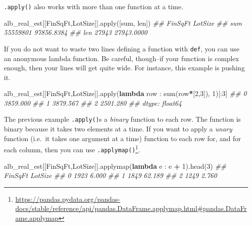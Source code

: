 \documentclass[
  12pt,
  krantz2]{krantz}
\makeatletter
\newenvironment{Shaded}{\begin{snugshade}}{\end{snugshade}}
\newcommand{\BuiltInTok}[1]{#1}
\newcommand{\CommentTok}[1]{\textcolor[rgb]{0.37,0.37,0.37}{\textit{#1}}}
\newcommand{\DecValTok}[1]{\textcolor[rgb]{0.06,0.06,0.06}{#1}}
\newcommand{\KeywordTok}[1]{\textcolor[rgb]{0.27,0.27,0.27}{\textbf{#1}}}
\newcommand{\NormalTok}[1]{#1}
\newcommand{\OperatorTok}[1]{\textcolor[rgb]{0.43,0.43,0.43}{\textbf{#1}}}
\newcommand{\StringTok}[1]{\textcolor[rgb]{0.5,0.5,0.5}{#1}}
\renewcommand{\href}[2]{#2\footnote{\url{#1}}}
\newenvironment{kframe}{%
\medskip{}
\setlength{\fboxsep}{.8em}
 \def\at@end@of@kframe{}%
 \ifinner\ifhmode%
  \def\at@end@of@kframe{\end{minipage}}%
  \begin{minipage}{\columnwidth}%
 \fi\fi%
 \def\FrameCommand##1{\hskip\@totalleftmargin \hskip-\fboxsep
 \colorbox{shadecolor}{##1}\hskip-\fboxsep
     \hskip-\linewidth \hskip-\@totalleftmargin \hskip\columnwidth}%
 \MakeFramed {\advance\hsize-\width
   \@totalleftmargin\z@ \linewidth\hsize
   \@setminipage}}%
 {\par\unskip\endMakeFramed%
 \at@end@of@kframe}
\renewenvironment{Shaded}{\begin{kframe}}{\end{kframe}}
\makeatother
\begin{document}
\texttt{.apply()} also works with more than one function at a time.

\begin{Shaded}
\begin{Highlighting}[]
\NormalTok{alb\_real\_est[[}\StringTok{\textquotesingle{}FinSqFt\textquotesingle{}}\NormalTok{,}\StringTok{\textquotesingle{}LotSize\textquotesingle{}}\NormalTok{]].}\BuiltInTok{apply}\NormalTok{([}\BuiltInTok{sum}\NormalTok{, }\BuiltInTok{len}\NormalTok{])}
\CommentTok{\#\#       FinSqFt     LotSize}
\CommentTok{\#\# sum  55559801  97856.8384}
\CommentTok{\#\# len     27943  27943.0000}
\end{Highlighting}
\end{Shaded}

If you do not want to waste two lines defining a function with \texttt{def}, you can use an anonymous lambda function. Be careful, though--if your function is complex enough, then your lines will get quite wide. For instance, this example is pushing it.

\begin{Shaded}
\begin{Highlighting}[]
\NormalTok{alb\_real\_est[[}\StringTok{\textquotesingle{}FinSqFt\textquotesingle{}}\NormalTok{,}\StringTok{\textquotesingle{}LotSize\textquotesingle{}}\NormalTok{]].}\BuiltInTok{apply}\NormalTok{(}\KeywordTok{lambda}\NormalTok{ row : }\BuiltInTok{sum}\NormalTok{(row}\OperatorTok{*}\NormalTok{[}\DecValTok{2}\NormalTok{,}\DecValTok{3}\NormalTok{]), }\DecValTok{1}\NormalTok{)[:}\DecValTok{3}\NormalTok{]}
\CommentTok{\#\# 0    3859.000}
\CommentTok{\#\# 1    3879.567}
\CommentTok{\#\# 2    2501.280}
\CommentTok{\#\# dtype: float64}
\end{Highlighting}
\end{Shaded}

The previous example \texttt{.apply()}s a \emph{binary} function to each row. The function is binary because it takes two elements at a time. If you want to apply a \emph{unary} function (i.e.~it takes one argument at a time) function to each row for, and for each column, then you can use \href{https://pandas.pydata.org/pandas-docs/stable/reference/api/pandas.DataFrame.applymap.html\#pandas.DataFrame.applymap}{\texttt{.applymap()}}.

\begin{Shaded}
\begin{Highlighting}[]
\NormalTok{alb\_real\_est[[}\StringTok{\textquotesingle{}FinSqFt\textquotesingle{}}\NormalTok{,}\StringTok{\textquotesingle{}LotSize\textquotesingle{}}\NormalTok{]].applymap(}\KeywordTok{lambda}\NormalTok{ e : e }\OperatorTok{+} \DecValTok{1}\NormalTok{).head(}\DecValTok{3}\NormalTok{)}
\CommentTok{\#\#    FinSqFt  LotSize}
\CommentTok{\#\# 0     1923    6.000}
\CommentTok{\#\# 1     1849   62.189}
\CommentTok{\#\# 2     1249    2.760}
\end{Highlighting}
\end{Shaded}
\end{document}
